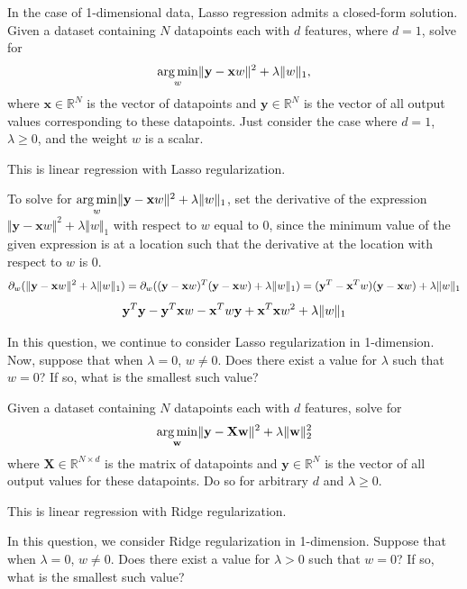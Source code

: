 \medskip
\lstset{
  basicstyle=\small\ttfamily,
  breaklines=true,
  columns=fullflexible
}



\problem[18]

\subproblem
In the case of 1-dimensional data, Lasso regression admits a closed-form solution.
Given a dataset containing $N$ datapoints each with $d$ features, where $d = 1$, solve for
\[\underset{w}{\operatorname{arg\,min}} \Vert\mathbf{y} - \mathbf{x}w\Vert^2 + \lambda\Vert w\Vert_1,
\]
where $\mathbf{x} \in \mathbb{R}^{N}$ is the vector of datapoints and $\mathbf{y} \in \mathbb{R}^N$ is the  vector of all output values corresponding to these datapoints. Just consider the case where $d = 1$, $\lambda \geq 0$, and the weight $w$ is a scalar.

This is linear regression with Lasso regularization.

To solve for $\underset{w}{\operatorname{arg\,min}} \Vert\mathbf{y} - \mathbf{x}w\Vert^2 + \lambda\Vert w\Vert_1$, set the derivative of the expression $\Vert\mathbf{y} - \mathbf{x}w\Vert^2 + \lambda\Vert w\Vert_1$ with respect to $w$ equal to 0, since the minimum value of the given expression is at a location such that the derivative at the location with respect to $w$ is 0.
\[ \partial_w (\Vert\textbf{y} - \textbf{x} w\Vert^2 + \lambda\Vert w\Vert_1) = \partial_w ((\textbf{y} - \textbf{x} w)^T(\textbf{y} - \textbf{x} w) + \lambda\Vert w\Vert_1) = (\textbf{y}^T - \textbf{x}^T w)(\textbf{y} - \textbf{x} w) + \lambda\Vert w\Vert_1 \]
\[ \textbf{y}^T\textbf{y} - \textbf{y}^T\textbf{x} w - \textbf{x}^T w \textbf{y} + \textbf{x}^T\textbf{x} w^2 + \lambda\Vert w\Vert_1 \]

\subproblem
In this question, we continue to consider Lasso regularization in 1-dimension. Now, suppose that when $\lambda = 0$, $w \neq 0$. Does there exist a value for $\lambda$ such that $w = 0$? If so, what is the smallest such value?



\subproblem
Given a dataset containing $N$ datapoints each with $d$ features, solve for
\[\underset{\mathbf{w}}{\operatorname{arg\,min}} \Vert\mathbf{y} - \mathbf{X}\mathbf{w}\Vert^2 + \lambda\Vert\mathbf{w}\Vert_2^2
\]
where $\mathbf{X} \in \mathbb{R}^{N \times d}$ is the matrix of datapoints and $\mathbf{y} \in \mathbb{R}^N$ is the  vector of all output values for these datapoints. Do so for arbitrary $d$ and $\lambda \geq 0$.

This is linear regression with Ridge regularization.



\subproblem In this question, we consider Ridge regularization in 1-dimension. Suppose that when $\lambda = 0$, $w \neq 0$. Does there exist a value for $\lambda > 0$ such that $w = 0$? If so, what is the smallest such value?




